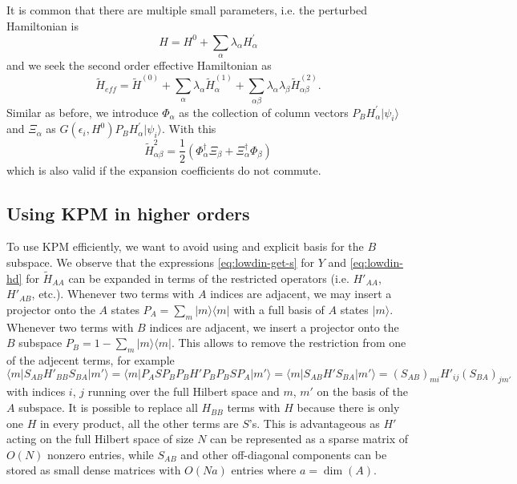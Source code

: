 \documentclass[10pt, onecolumn, aps, prb, superscriptaddress, floatfix, showpacs, notitlepage]{revtex4-1}
\newcommand{\ket}[1]{|#1\rangle}
\begin{document}
It is common that there are multiple small parameters, i.e. the perturbed Hamiltonian is
\[H = H^0 + \sum_{\alpha} \lambda_{\alpha} H^{\prime}_{\alpha}\]
and we seek the second order effective Hamiltonian as
\[\tilde{H}_{eff} = \tilde{H}^{(0)} +  \sum_{\alpha} \lambda_{\alpha} \tilde{H}^{(1)}_{\alpha} +  \sum_{\alpha\beta} \lambda_{\alpha}\lambda_{\beta}\tilde{H}^{(2)}_{\alpha\beta}.\]
Similar as before, we introduce $\Phi_{\alpha}$ as the collection of column vectors $P_B H^{\prime}_{\alpha}\ket{\psi_i}$ and $\Xi_{\alpha}$ as $G(\epsilon_i, H^0) P_B H^{\prime}_{\alpha}\ket{\psi_i}$. With this
\[\tilde{H}^2_{\alpha\beta} = \frac{1}{2} (\Phi_{\alpha}^\dag \Xi_{\beta} + \Xi_{\alpha}^\dag\Phi_{\beta})\]
which is also valid if the expansion coefficients do not commute.

\subsection{Using KPM in higher orders}

To use KPM efficiently, we want to avoid using and explicit basis for the $B$ subspace.
We observe that the expressions \eqref{eq:lowdin-get-s} for $Y$ and \eqref{eq:lowdin-hd} for $\tilde{H}_{AA}$ can be expanded in terms of the restricted operators (i.e. $H'_{AA}$, $H'_{AB}$, etc.).
Whenever two terms with $A$ indices are adjacent, we may insert a projector onto the $A$ states $P_A = \sum_m | m \rangle\langle m |$ with a full basis of $A$ states $| m \rangle$.
Whenever two terms with $B$ indices are adjacent, we insert a projector onto the $B$ subspace $P_B = 1 - \sum_m | m \rangle\langle m |$. This allows to remove the restriction from one of the adjecent terms, for example
\begin{equation}
\langle m | S_{AB} H'_{BB} S_{BA} | m' \rangle = \langle m | P_A S P_B P_B H' P_B P_B S P_A  | m' \rangle = \langle m | S_{AB} H' S_{BA} | m' \rangle = \left(S_{AB}\right)_{mi} H'_{ij} \left(S_{BA}\right)_{j m'}
\end{equation}
with indices $i$, $j$ running over the full Hilbert space and $m$, $m'$ on the basis of the $A$ subspace.
It is possible to replace all $H_{BB}$ terms with $H$ because there is only one $H$ in every product, all the other terms are $S$'s.
This is advantageous as $H'$ acting on the full Hilbert space of size $N$ can be represented as a sparse matrix of $O(N)$ nonzero entries, while $S_{AB}$ and other off-diagonal components can be stored as small dense matrices with $O(N a)$ entries where $a = \dim(A)$.
\end{document}
